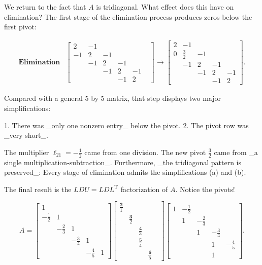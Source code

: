 We return to the fact that \(A\) is tridiagonal. What effect does this have on elimination? The first stage of the elimination process produces zeros below the first pivot:

\[\begin{array}{ccccc}\textbf{Elimination}&\left[\begin{array}{ccccc}2&-1&&&&\\ -1&2&-1&&\\ &-1&2&-1&\\ &&-1&2&-1\\ &&&-1&2\end{array}\right]\rightarrow\left[\begin{array}{ccccc}2&-1&&\\ 0&\frac{3}{2}&-1&&\\ &-1&2&-1&\\ &&-1&2&-1\\ &&&-1&2\end{array}\right].\end{array}\]

Compared with a general 5 by 5 matrix, that step displays two major simplifications:

1. There was _only one nonzero entry_ below the pivot.
2. The pivot row was _very short_.

The multiplier \(\ell_{21}=-\frac{1}{2}\) came from one division. The new pivot \(\frac{3}{2}\) came from _a single multiplication-subtraction_. Furthermore, _the tridiagonal pattern is preserved_: Every stage of elimination admits the simplifications (a) and (b).

The final result is the \(LDU=LDL^{\mathrm{T}}\) factorization of \(A\). Notice the pivots!

\[A=\begin{bmatrix}1&&&&\\ -\frac{1}{2}&1&&\\ &-\frac{2}{3}&1&&\\ &&-\frac{3}{4}&1&\\ &&&-\frac{4}{5}&1\end{bmatrix}\begin{bmatrix}\frac{\mathbf{2}}{1}&&&&\\ &\frac{\mathbf{3}}{2}&&\\ &&\frac{\mathbf{4}}{3}&\\ &&\frac{\mathbf{5}}{4}&\\ &&&\frac{\mathbf{6}}{5}\end{bmatrix}\begin{bmatrix}1&-\frac{1}{2}&&\\ &1&-\frac{2}{3}&&\\ &&1&-\frac{3}{4}&\\ &&&1&-\frac{4}{5}\\ &&&1\end{bmatrix}.\]

